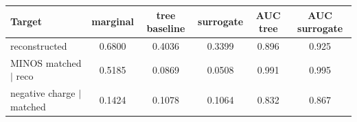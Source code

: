 \begin{tabular}{lccccc}
\toprule
Target & marginal & tree baseline & surrogate & AUC tree & AUC surrogate \\
\midrule
reconstructed & 0.6800 & 0.4036 & 0.3399 & 0.896 & 0.925 \\
MINOS matched $\mid$ reco & 0.5185 & 0.0869 & 0.0508 & 0.991 & 0.995 \\
negative charge $\mid$ matched & 0.1424 & 0.1078 & 0.1064 & 0.832 & 0.867 \\
\bottomrule
\end{tabular}
